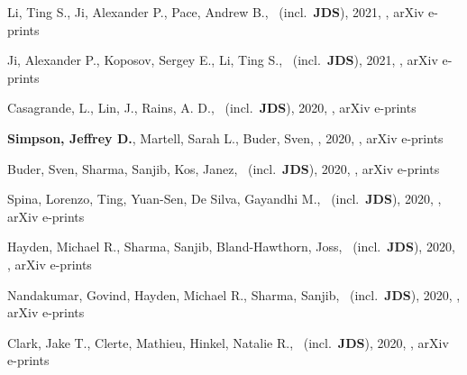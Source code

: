 \item[{\color{numcolor}\scriptsize16}] Li, Ting S., Ji, Alexander P., Pace, Andrew B., \etal\ (incl.\ \textbf{JDS}), 2021, , arXiv e-prints

\item[{\color{numcolor}\scriptsize15}] Ji, Alexander P., Koposov, Sergey E., Li, Ting S., \etal\ (incl.\ \textbf{JDS}), 2021, , arXiv e-prints

\item[{\color{numcolor}\scriptsize14}] Casagrande, L., Lin, J., Rains, A. D., \etal\ (incl.\ \textbf{JDS}), 2020, , arXiv e-prints

\item[{\color{numcolor}\scriptsize13}] \textbf{Simpson, Jeffrey D.}, Martell, Sarah L., Buder, Sven, \etal, 2020, , arXiv e-prints

\item[{\color{numcolor}\scriptsize12}] Buder, Sven, Sharma, Sanjib, Kos, Janez, \etal\ (incl.\ \textbf{JDS}), 2020, , arXiv e-prints

\item[{\color{numcolor}\scriptsize11}] Spina, Lorenzo, Ting, Yuan-Sen, De Silva, Gayandhi M., \etal\ (incl.\ \textbf{JDS}), 2020, , arXiv e-prints

\item[{\color{numcolor}\scriptsize10}] Hayden, Michael R., Sharma, Sanjib, Bland-Hawthorn, Joss, \etal\ (incl.\ \textbf{JDS}), 2020, , arXiv e-prints

\item[{\color{numcolor}\scriptsize9}] Nandakumar, Govind, Hayden, Michael R., Sharma, Sanjib, \etal\ (incl.\ \textbf{JDS}), 2020, , arXiv e-prints

\item[{\color{numcolor}\scriptsize8}] Clark, Jake T., Clerte, Mathieu, Hinkel, Natalie R., \etal\ (incl.\ \textbf{JDS}), 2020, , arXiv e-prints


